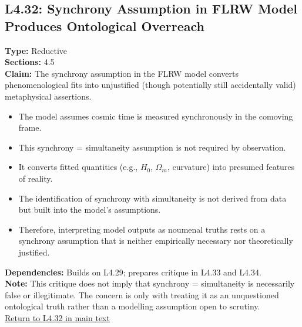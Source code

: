 \documentclass[12pt]{book}
\newcommand{\returnlink}[1]{\hyperref[logic:#1]{Return to #1 in main text}\xspace}
\begin{document}
\subsection*{L4.32: Synchrony Assumption in FLRW Model Produces Ontological Overreach}
\label{appendix:L4.32}
\textbf{Type:} Reductive \\
\textbf{Sections:} 4.5 \\
\textbf{Claim:} The synchrony assumption in the FLRW model converts phenomenological fits into unjustified (though potentially still accidentally valid) metaphysical assertions.
\begin{itemize}
  \item The model assumes cosmic time is measured synchronously in the comoving frame.
  \item This synchrony = simultaneity assumption is not required by observation.
  \item It converts fitted quantities (e.g., \( H_0 \), \( \Omega_m \), curvature) into presumed features of reality.
  \item The identification of synchrony with simultaneity is not derived from data but built into the model's assumptions.
  \item Therefore, interpreting model outputs as noumenal truths rests on a synchrony assumption that is neither empirically necessary nor theoretically justified.
\end{itemize}
\textbf{Dependencies:} Builds on L4.29; prepares critique in L4.33 and L4.34.\\
\textbf{Note:} This critique does not imply that synchrony = simultaneity is necessarily false or illegitimate. The concern is only with treating it as an unquestioned ontological truth rather than a modelling assumption open to scrutiny.\\
\returnlink{L4.32}
\end{document}
